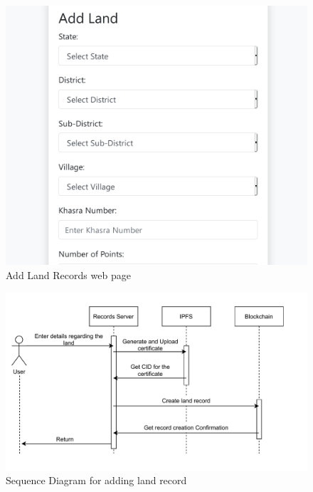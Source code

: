 \documentclass{article}
\begin{document}
            \begin{figure}[htbp]
                \includegraphics[scale=0.25]{records_add}
                \centering
                \caption{Add Land Records web page}
            \end{figure}
            \begin{figure}[htbp]
                \includegraphics[scale=0.25]{records_seq_add}
                \centering
                \caption{Sequence Diagram for adding land record}
            \end{figure}
        
\end{document}
